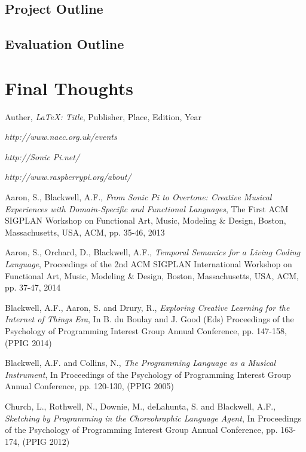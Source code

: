 \documentclass[11pt]{scrartcl}
\begin{document}
\subsection{Project Outline}

\subsection{Evaluation Outline}

\section{Final Thoughts}

\begin{thebibliography}{9}

  Auther,
  \emph{\LaTeX: Title},
  Publisher, Place,
  Edition,
  Year

  \emph{http://www.naec.org.uk/events}

  \emph{http://Sonic Pi.net/}

  \emph{http://www.raspberrypi.org/about/}

  Aaron, S., Blackwell, A.F.,
  \emph{From Sonic Pi to Overtone: Creative Musical Experiences with Domain-Specific and Functional Languages},
  The First ACM SIGPLAN Workshop on Functional Art, Music, Modeling \& Design,
  Boston, Massachusetts, USA,
  ACM, pp. 35-46,
  2013

  Aaron, S., Orchard, D., Blackwell, A.F.,
  \emph{Temporal Semanics for a Living Coding Language},
  Proceedings of the 2nd ACM SIGPLAN International Workshop on Functional Art, Music, Modeling \& Design,
  Boston, Massachusetts, USA,
  ACM, pp. 37-47,
  2014

  Blackwell, A.F., Aaron, S. and Drury, R., 
  \emph{Exploring Creative Learning for the Internet of Things Era},
  In B. du Boulay and J. Good (Eds) Proceedings of the Psychology of Programming Interest Group Annual Conference, 
  pp. 147-158,
  (PPIG 2014)

  Blackwell, A.F. and Collins, N.,
  \emph{The Programming Language as a Musical Instrument},
  In Proceedings of the Psychology of Programming Interest Group Annual Conference,
  pp. 120-130,
  (PPIG 2005)

  Church, L., Rothwell, N., Downie, M., deLahunta, S. and Blackwell, A.F.,
  \emph{Sketching by Programming in the Choreohraphic Language Agent},
  In Proceedings of the Psychology of Programming Interest Group Annual Conference,
  pp. 163-174,
  (PPIG 2012)


\end{thebibliography}
\end{document}
